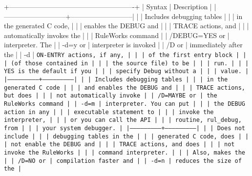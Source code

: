 +-------------------------------------------------------+
| Syntax                    | Description               |
|---------------------------+---------------------------|
|                           | Includes debugging tables |
|                           | in the generated C code,  |
|                           | enables the DEBUG and     |
|                           | TRACE actions, and        |
|                           | automatically invokes the |
|                           | RuleWorks command         |
| /DEBUG=YES or             | interpreter. The          |
| -d=y or                   | interpreter is invoked    |
| /D or                     | immediately after the     |
| -d                        | \tt{ON-ENTRY} actions, if any, |
|                           | of the first entry block  |
|                           | (of those contained in    |
|                           | the source file) to be    |
|                           | run.                      |
|                           | YES is the default if you |
|                           | specify Debug without a   |
|                           | value.                    |
|---------------------------+---------------------------|
|                           | Includes debugging tables |
|                           | in the generated C code   |
|                           | and enables the DEBUG and |
|                           | TRACE actions, but does   |
|                           | not automatically invoke  |
| /D=MAYBE or               | the RuleWorks command     |
| -d=m                      | interpreter. You can put  |
|                           | the DEBUG action in any   |
|                           | executable statement to   |
|                           | invoke the interpreter,   |
|                           | or you can call the API   |
|                           | routine, \verb|rul_debug|, from  |
|                           | your system debugger.     |
|---------------------------+---------------------------|
|                           | Does not include          |
|                           | debugging tables in the   |
|                           | generated C code, does    |
|                           | not enable the DEBUG and  |
|                           | TRACE actions, and does   |
|                           | not invoke the RuleWorks  |
|                           | command interpreter.      |
|                           | Also, makes the           |
| /D=NO or                  | compilation faster and    |
| -d=n                      | reduces the size of the   |
